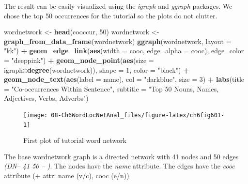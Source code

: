 \documentclass[
]{article}
\newenvironment{Shaded}{\begin{snugshade}}{\end{snugshade}}
\newcommand{\AttributeTok}[1]{\textcolor[rgb]{0.13,0.29,0.53}{#1}}
\newcommand{\DecValTok}[1]{\textcolor[rgb]{0.00,0.00,0.81}{#1}}
\newcommand{\FunctionTok}[1]{\textcolor[rgb]{0.13,0.29,0.53}{\textbf{#1}}}
\newcommand{\NormalTok}[1]{#1}
\newcommand{\OtherTok}[1]{\textcolor[rgb]{0.56,0.35,0.01}{#1}}
\newcommand{\SpecialCharTok}[1]{\textcolor[rgb]{0.81,0.36,0.00}{\textbf{#1}}}
\newcommand{\StringTok}[1]{\textcolor[rgb]{0.31,0.60,0.02}{#1}}
\begin{document}
\normalsize

The result can be easily visualized using the \emph{igraph} and \emph{ggraph} packages. We chose the top 50 occurrences for the tutorial so the plots do not clutter.

\begin{Shaded}
\begin{Highlighting}[]
\NormalTok{wordnetwork }\OtherTok{\textless{}{-}} \FunctionTok{head}\NormalTok{(cooccur, }\DecValTok{50}\NormalTok{)}
\NormalTok{wordnetwork }\OtherTok{\textless{}{-}} \FunctionTok{graph\_from\_data\_frame}\NormalTok{(wordnetwork)}
\FunctionTok{ggraph}\NormalTok{(wordnetwork, }\AttributeTok{layout =} \StringTok{"kk"}\NormalTok{) }\SpecialCharTok{+}
  \FunctionTok{geom\_edge\_link}\NormalTok{(}\FunctionTok{aes}\NormalTok{(}\AttributeTok{width =}\NormalTok{ cooc, }\AttributeTok{edge\_alpha =}\NormalTok{ cooc), }
                 \AttributeTok{edge\_color =} \StringTok{"deeppink"}\NormalTok{) }\SpecialCharTok{+}
  \FunctionTok{geom\_node\_point}\NormalTok{(}\FunctionTok{aes}\NormalTok{(}\AttributeTok{size =}\NormalTok{ igraph}\SpecialCharTok{::}\FunctionTok{degree}\NormalTok{(wordnetwork)), }
                  \AttributeTok{shape =} \DecValTok{1}\NormalTok{, }\AttributeTok{color =} \StringTok{"black"}\NormalTok{) }\SpecialCharTok{+}
  \FunctionTok{geom\_node\_text}\NormalTok{(}\FunctionTok{aes}\NormalTok{(}\AttributeTok{label =}\NormalTok{ name), }\AttributeTok{col =} \StringTok{"darkblue"}\NormalTok{, }\AttributeTok{size =} \DecValTok{3}\NormalTok{) }\SpecialCharTok{+}
  \FunctionTok{labs}\NormalTok{(}\AttributeTok{title =} \StringTok{"Co{-}occurrences Within Sentence"}\NormalTok{,}
       \AttributeTok{subtitle =} \StringTok{"Top 50 Nouns, Names, Adjectives, Verbs, Adverbs"}\NormalTok{)}
\end{Highlighting}
\end{Shaded}

\begin{figure}

{\centering \texttt{[image: 08-Ch6WordLocNetAnal\_files/figure-latex/ch6fig601-1]} 

}

\caption{First plot of tutorial word network}\label{fig:ch6fig601}
\end{figure}

The base wordnetwork graph is a directed network with 41 nodes and 50 edges \emph{(DN-- 41 50 -- )}. The nodes have the \emph{name} attribute. The edges have the \emph{cooc} attribute (+ attr: name (v/c), cooc (e/n))
\end{document}
